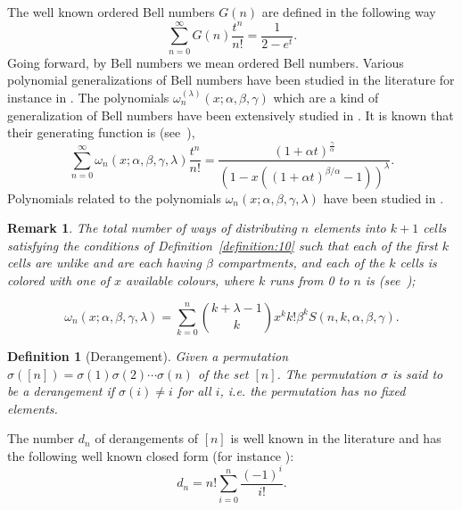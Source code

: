 \documentclass[12pt]{amsart}
\newtheorem{proof 1}{proof 1}
\newtheorem{remark}{Remark}[section]
\newtheorem{definition}{Definition}[section]
\begin{document}
	The well known ordered Bell numbers $G(n)$ are defined  in the following way
\begin{equation}\label{equation:33}
	\sum\limits_{n=0}^{\infty}G(n)\frac{t^n}{n!}=\frac{1}{2-e^t}. 
\end{equation} Going forward, by Bell numbers we mean ordered Bell numbers. 
Various polynomial generalizations of Bell numbers have been studied in the literature for instance in \cite{adell2023generalized,JoseNkonkobeunified,BoyadzhievDil2016,corcino2020second,gross,kargin2016mellin,kimfubini}. The polynomials $\omega _n^{(\lambda)}(x;{\alpha}, \beta, \gamma)$ which are a kind of generalization of Bell numbers have been extensively studied in \cite{kargin2018higher,kargin2019recurrences}. It is known that their generating function is (see~\cite{kargin2018higher}),
\begin{equation}\label{equation:5}	\sum\limits_{n=0}^{\infty} \omega _n(x;{\alpha}, \beta, \gamma,\lambda)\frac{t^n}{n!}=
	\frac{(1+{\alpha} t)^{\frac{\gamma}{{\alpha}}}}{(1-x((1+{\alpha} t)^{\beta/{\alpha}}-1))^{\lambda}}.\end{equation}
Polynomials related to the polynomials $\omega _n(x;{\alpha}, \beta, \gamma,\lambda)$ have been studied in \cite{mihoubi2017partial}.
\begin{remark}\label{remark:1}
	The total number of ways of distributing $n$ elements into $k+1$ cells satisfying the conditions of Definition~\ref{definition:10} such that each of the first $k$ cells are unlike and are each having $\beta$ compartments, and  each of the $k$ cells is colored with one of $x$ available colours, where $k$ runs from 0 to $n$ is (see~\cite{nkonkobe2020combinatorial}); 
	
	
	\begin{equation}\label{equation:6}
		\omega _n(x;{\alpha}, \beta, \gamma,\lambda)=\sum\limits_{k=0}^{n}\binom{k+\lambda-1}{k}x^kk!\beta^k S(n,k,\alpha,\beta,\gamma).
\end{equation}\end{remark}



\begin{definition}[Derangement\cite{remond1980essai}] Given a permutation $\sigma([n])=\sigma(1)\sigma(2)\cdots\sigma(n)$ of the set $[n]$. The permutation $\sigma$ is said to be a derangement if $\sigma(i)\not=i$ for all $i$, i.e. the permutation has no fixed elements.
	
\end{definition}The number $d_n$ of derangements of $[n]$ is well known in the literature  and has the following well known closed form (for instance \cite{comtet1974advanced,graham1989concrete,wilf2005generatingfunctionology}): \begin{equation}
	d_n=n!\sum\limits_{i=0}^n\frac{(-1)^i}{i!}.
\end{equation}
\end{document}
